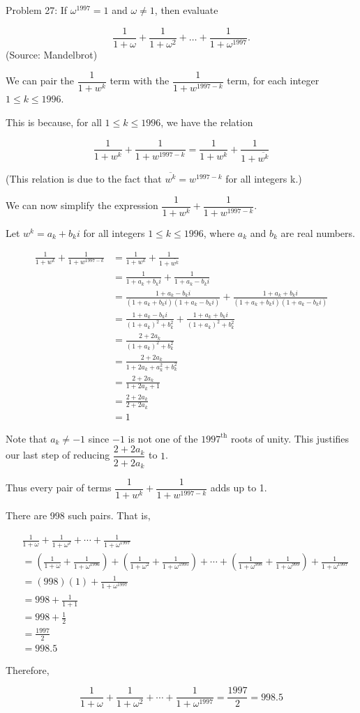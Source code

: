 Problem 27: If $\omega^{1997} = 1$ and $\omega \neq 1$, then evaluate

\[\frac{1}{1 + \omega} + \frac{1}{1 + \omega^2} + \dots + \frac{1}{1 + \omega^{1997}}.\] (Source: Mandelbrot)

We can pair the $\dfrac{1}{1 + w^k}$ term with the $\dfrac{1}{1 + w^{1997-k}}$ term, for each integer $1 \leq k \leq 1996$.

This is because, for all $1 \leq k \leq 1996$, we have the relation

$$\frac{1}{1 + w^k} + \frac{1}{1 + w^{1997-k}} = \frac{1}{1 + w^k} + \frac{1}{1 + \overline{w^k}}$$

(This relation is due to the fact that $\overline{w^k} = w^{1997-k}$ for all integers k.)

We can now simplify the expression $\dfrac{1}{1 + w^k} + \dfrac{1}{1 + w^{1997-k}}$.

Let $w^k = a_k + b_k i$ for all integers $1 \leq k \leq 1996$, where $a_k$ and $b_k$ are real numbers.

\begin{align*}
\frac{1}{1 + w^k} + \frac{1}{1 + w^{1997-k}} &= \frac{1}{1 + w^k} + \frac{1}{1 + \overline{w^k}} \\
&= \frac{1}{1 + a_k + b_ki} + \frac{1}{1 + a_k - b_ki} \\
&= \frac{1 + a_k - b_ki}{(1 + a_k + b_ki)(1 + a_k - b_ki)} + \frac{1 + a_k + b_ki}{(1 + a_k + b_ki)(1 + a_k - b_ki)} \\
&= \frac{1 + a_k - b_ki}{(1 + a_k)^2 + b_k^2} + \frac{1 + a_k + b_ki}{(1 + a_k)^2 + b_k^2} \\
&= \frac{2 + 2a_k}{(1 + a_k)^2 + b_k^2} \\
&= \frac{2 + 2a_k}{1 + 2a_k + a_k^2 + b_k^2} \\
&= \frac{2 + 2a_k}{1 + 2a_k + 1} \\
&= \frac{2 + 2a_k}{2 + 2a_k} \\
&= 1
\end{align*}

Note that $a_k \neq -1$ since $-1$ is not one of the $1997^{\text{th}}$ roots of unity. This justifies our last step of reducing $\dfrac{2 + 2a_k}{2 + 2a_k}$ to $1$.

Thus every pair of terms $\dfrac{1}{1 + w^k} + \dfrac{1}{1 + w^{1997-k}}$ adds up to 1.

There are 998 such pairs. That is,

\begin{align*}
& \frac{1}{1 + \omega} + \frac{1}{1 + \omega^2} + \cdots + \frac{1}{1 + \omega^{1997}} \\
&= \left(\frac{1}{1 + \omega} + \frac{1}{1 + \omega^{1996}}\right) + \left(\frac{1}{1 + \omega^2} + \frac{1}{1 + \omega^{1995}}\right) + \cdots + \left(\frac{1}{1 + \omega^{998}} + \frac{1}{1 + \omega^{999}}\right) + \frac{1}{1 + \omega^{1997}} \\
&= (998)(1) + \frac{1}{1 + \omega^{1997}} \\
&= 998+ \frac{1}{1 + 1} \\
&= 998+ \frac{1}{2} \\
&= \frac{1997}{2} \\
&= 998.5
\end{align*}

Therefore,

$$ \boxed{\frac{1}{1 + \omega} + \frac{1}{1 + \omega^2} + \cdots + \frac{1}{1 + \omega^{1997}} = \frac{1997}{2} = 998.5} $$
